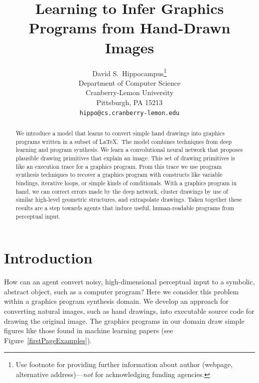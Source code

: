 \documentclass{article}
\title{Learning to Infer Graphics Programs from Hand-Drawn Images}
\author{
  David S.~Hippocampus\thanks{Use footnote for providing further
    information about author (webpage, alternative
    address)---\emph{not} for acknowledging funding agencies.} \\
  Department of Computer Science\\
  Cranberry-Lemon University\\
  Pittsburgh, PA 15213 \\
  \texttt{hippo@cs.cranberry-lemon.edu} \\
}
\newcommand{\remark}[1]{\textcolor{red}{[#1]}}
\begin{document}

\maketitle

\begin{abstract}
  We introduce a model that learns to convert simple hand drawings
  into graphics programs written in a subset of \LaTeX.~The model
  combines techniques from deep learning and program synthesis.  We
  learn a convolutional neural network that proposes plausible drawing primitives
  that explain an image. This set of drawing primitives is like an execution trace for a graphics program. From this trace we use
  program synthesis techniques to recover a graphics
  program with constructs like variable bindings, iterative loops, or
  simple kinds of conditionals. With a graphics program in hand,
  we can correct errors made by the deep network, cluster drawings by use of similar high-level geometric structures, and extrapolate drawings.
  Taken together these results are a step towards
  agents that induce useful, human-readable programs from perceptual input.  
\end{abstract}

\section{Introduction}

 How can an agent convert noisy, high-dimensional perceptual input
 to a symbolic, abstract object, such as a computer program?  Here we
 consider this problem within a graphics program synthesis domain.  We
 develop an approach for converting natural images, such as hand
 drawings, into executable source code for drawing the original image.
 The graphics programs in our domain draw simple figures like those found in
 machine learning papers (see Figure~\ref{firstPageExamples}).
\end{document}
